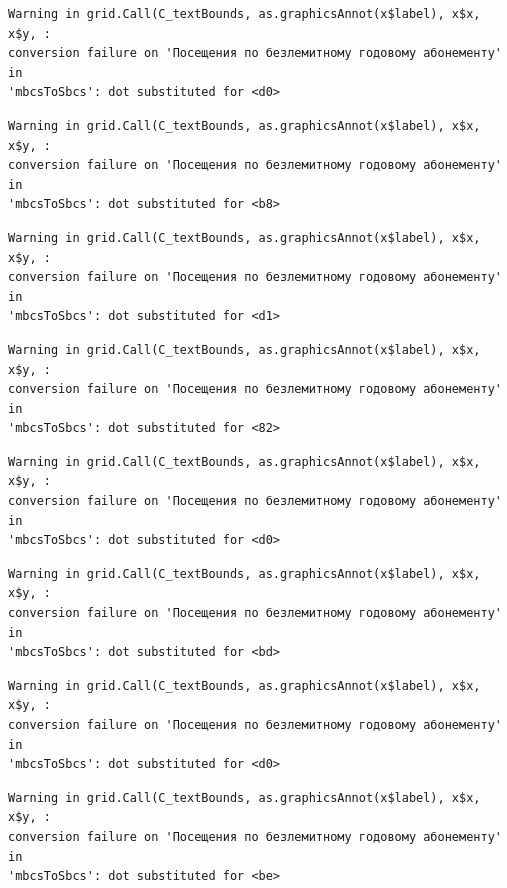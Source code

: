 \documentclass[
  letterpaper,
  DIV=11,
  numbers=noendperiod]{scrartcl}
\begin{document}
\begin{verbatim}
Warning in grid.Call(C_textBounds, as.graphicsAnnot(x$label), x$x, x$y, :
conversion failure on 'Посещения по безлемитному годовому абонементу' in
'mbcsToSbcs': dot substituted for <d0>
\end{verbatim}

\begin{verbatim}
Warning in grid.Call(C_textBounds, as.graphicsAnnot(x$label), x$x, x$y, :
conversion failure on 'Посещения по безлемитному годовому абонементу' in
'mbcsToSbcs': dot substituted for <b8>
\end{verbatim}

\begin{verbatim}
Warning in grid.Call(C_textBounds, as.graphicsAnnot(x$label), x$x, x$y, :
conversion failure on 'Посещения по безлемитному годовому абонементу' in
'mbcsToSbcs': dot substituted for <d1>
\end{verbatim}

\begin{verbatim}
Warning in grid.Call(C_textBounds, as.graphicsAnnot(x$label), x$x, x$y, :
conversion failure on 'Посещения по безлемитному годовому абонементу' in
'mbcsToSbcs': dot substituted for <82>
\end{verbatim}

\begin{verbatim}
Warning in grid.Call(C_textBounds, as.graphicsAnnot(x$label), x$x, x$y, :
conversion failure on 'Посещения по безлемитному годовому абонементу' in
'mbcsToSbcs': dot substituted for <d0>
\end{verbatim}

\begin{verbatim}
Warning in grid.Call(C_textBounds, as.graphicsAnnot(x$label), x$x, x$y, :
conversion failure on 'Посещения по безлемитному годовому абонементу' in
'mbcsToSbcs': dot substituted for <bd>
\end{verbatim}

\begin{verbatim}
Warning in grid.Call(C_textBounds, as.graphicsAnnot(x$label), x$x, x$y, :
conversion failure on 'Посещения по безлемитному годовому абонементу' in
'mbcsToSbcs': dot substituted for <d0>
\end{verbatim}

\begin{verbatim}
Warning in grid.Call(C_textBounds, as.graphicsAnnot(x$label), x$x, x$y, :
conversion failure on 'Посещения по безлемитному годовому абонементу' in
'mbcsToSbcs': dot substituted for <be>
\end{verbatim}
\end{document}
